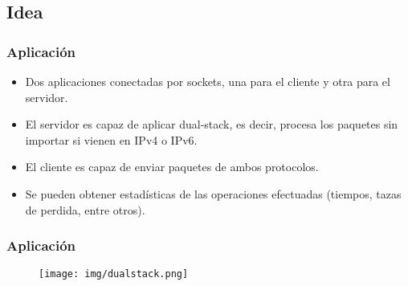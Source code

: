 \subsection{Idea}
\begin{frame}
	\frametitle{Aplicación}
	\begin{itemize}
	\item
		Dos aplicaciones conectadas por sockets, una para el cliente y otra
		para el servidor.
	\item
		El servidor es capaz de aplicar dual-stack, es decir, procesa los
		paquetes sin importar si vienen en IPv4 o IPv6.
	\item
		El cliente es capaz de enviar paquetes de ambos protocolos.
	\item
		Se pueden obtener estadísticas de las operaciones efectuadas (tiempos,
		tazas de perdida, entre otros).
	\end{itemize}
\end{frame}

\begin{frame}
	\frametitle{Aplicación}
	\begin{figure}
		\centering
		\texttt{[image: img/dualstack.png]}
	\end{figure}
\end{frame}
